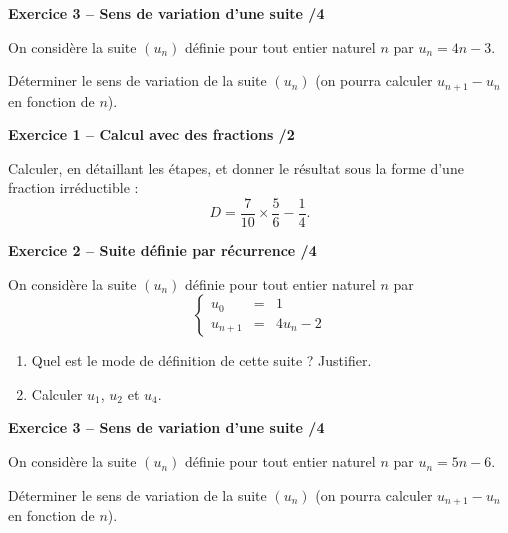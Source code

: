 \documentclass[10pt,a4paper]{article}
\begin{document}
\vspace{3cm}

\textbf{Exercice 3 -- Sens de variation d'une suite \hfill /4}

On considère la suite \((u_n)\) définie pour tout entier naturel \(n\) par \(u_n=4n-3\).

Déterminer le sens de variation de la suite \((u_n)\) (on pourra calculer \(u_{n+1}-u_n\) en fonction de \(n\)).

\newpage



\textbf{Exercice 1 -- Calcul avec des fractions \hfill /2}

Calculer, en détaillant les étapes, et donner le résultat sous la forme d'une fraction irréductible :
\[
D = \frac{7}{10}\times\frac{5}{6}-\frac{1}{4}.
\]

\vspace{3cm}

\textbf{Exercice 2 -- Suite définie par récurrence \hfill /4}

On considère la suite \((u_n)\) définie pour tout entier naturel \(n\) par
\[
\left\{\begin{array}{rcl}
u_0 &=& 1 \\
u_{n+1} &=& 4u_n-2
\end{array}\right.
\]

\begin{enumerate}
\item Quel est le mode de définition de cette suite ? Justifier.

\vspace{2cm}

\item Calculer \(u_1\), \(u_2\) et \(u_4\).
\end{enumerate}

\vspace{3cm}

\textbf{Exercice 3 -- Sens de variation d'une suite \hfill /4}

On considère la suite \((u_n)\) définie pour tout entier naturel \(n\) par \(u_n=5n-6\).

Déterminer le sens de variation de la suite \((u_n)\) (on pourra calculer \(u_{n+1}-u_n\) en fonction de \(n\)).
\end{document}
